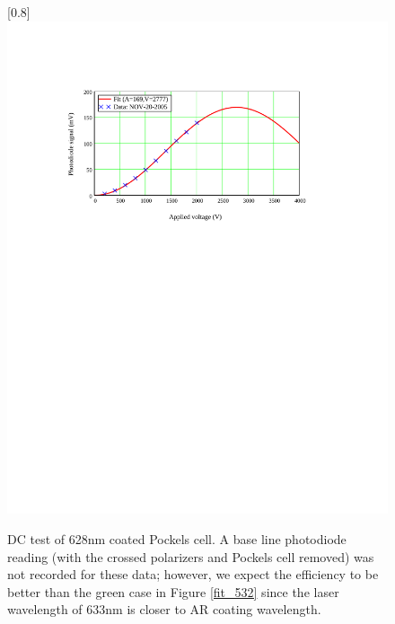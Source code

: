 \begin{figure}
\scalebox{0.8}[0.8]{
\includegraphics[bb=30 467 481 706]
{fit_628/fit_628.pdf}
}
\caption[DC test of 628nm coated Pockels cell]{DC test of 628nm coated Pockels cell. A base line photodiode reading (with the crossed polarizers and Pockels cell removed) was not recorded for these data; however, we expect the efficiency to be better than the green case in Figure \ref{fit_532} since the laser wavelength of 633nm is closer to AR coating wavelength.}
\label{fit_628}
\end{figure}
